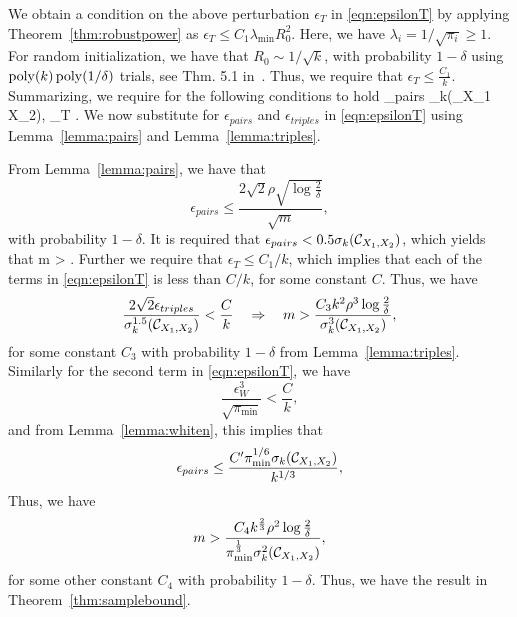 We obtain a condition on the above perturbation $\epsilon_T$ in \eqref{eqn:epsilonT} by applying Theorem~\ref{thm:robustpower} as
$ \epsilon_T\leq C_1\lambda_{\min} R_0^2$. Here, we have $\lambda_{i} = 1/\sqrt{\pi_{i}}\geq 1$. For random initialization, we have that $R_0 \sim 1/\sqrt{k}$, with probability $1-\delta$ using $\operatorname{poly}(k) \operatorname{poly}(1/\delta)$ trials, see Thm. 5.1 in~\cite{AnandkumarEtal:tensor12}. Thus, we require that $ \epsilon_T  \leq \frac{C_1}{k}$. Summarizing, we require for the following conditions to hold
\beq\epsilon_{pairs} \sigma_k(\Ccal_{X_1 X_2}), \quad \epsilon_T  \leq {}.\eeq
We now substitute for $\epsilon_{pairs}$ and $\epsilon_{triples}$ in \eqref{eqn:epsilonT} using Lemma~\ref{lemma:pairs} and Lemma~\ref{lemma:triples}.



From Lemma~\ref{lemma:pairs}, we have that
\[ \epsilon_{pairs}  \leqslant \frac{2\sqrt{2}\rho \sqrt{\log\frac{2}{\delta}}}{\sqrt{m}}, \]with probability $1-\delta$. It is required that $\epsilon_{pairs} < 0.5 \sigma_k(\mathcal{C}_{X_1, X_2})$, which yields that \beq\label{eqn:cond1} m > .\eeq
Further we require that $\epsilon_T \leq C_1/k$, which implies that each of the terms in \eqref{eqn:epsilonT} is less than $C/k$, for some constant $C$. Thus, we have
\[ \frac{2\sqrt{2} \epsilon_{triples}}{\sigma_k^{1.5}(\Ccal_{X_1, X_2})} < \frac{C}{k}\quad\Rightarrow\quad m > \frac{C_3 k^2 \rho^3 \log \frac{2}{\delta}}{\sigma_k^{3}(\Ccal_{X_1, X_2})},\]
for some constant $C_3$ with probability $1-\delta$ from Lemma~\ref{lemma:triples}. Similarly for the second term in \eqref{eqn:epsilonT}, we have
\[\frac{\epsilon_W^3}{\sqrt{\pi_{\min}}}< \frac{C}{k},\]and from Lemma~\ref{lemma:whiten}, this implies that \[ \epsilon_{pairs} \leq \frac{C' \pi_{\min}^{1/6} \sigma_k(\Ccal_{X_1, X_2})}{k^{1/3}\iffalse(1+\sigma_{k+1}(\Ccal_{X_1, X_2}))\fi},\]Thus, we have
\[  m > \frac{C_4 k^{\frac{2}{3}} \rho^2 \log\frac{2}{\delta}\iffalse (1+\sigma_{k+1}(\Ccal_{X_1, X_2}))^2\fi}{\pi_{\min}^{\frac{1}{3}} \sigma^2_k(\Ccal_{X_1, X_2})}, \]for some other constant $C_4$ with probability $1-\delta$. \iffalse Additionally, we also require
\[ (1+\sigma_{k+1}(\Ccal_{X_1, X_2}))\sigma_{k+1}(\Ccal_{X_1, X_2})\leq \frac{C_5 \pi_{\min}^{1/6} \sigma_k(\Ccal_{X_1, X_2})}{k^{1/3}}.\]\fi
 Thus, we have the result in Theorem~\ref{thm:samplebound}.


